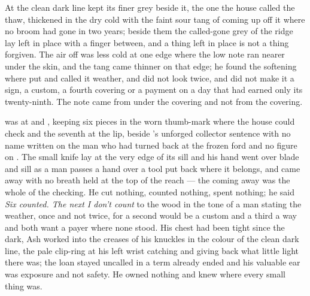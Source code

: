 At  the clean dark line kept its finer grey beside it, the one the house called the thaw, thickened in the dry cold with the faint sour tang of  coming up off it where no broom had gone in two years; beside them the called-gone grey of the ridge lay left in place with a finger between, and a thing left in place is not a thing forgiven. The air off  was less cold at one edge where the low note ran nearer under the skin, and the tang came thinner on that edge; he found the softening where put and called it weather, and did not look twice, and did not make it a sign, a custom, a fourth covering or a payment on a day that had earned only its twenty-ninth. The note came from under the covering and not from the covering.

 was at  and , keeping six pieces in the worn thumb-mark where the house could check and the seventh at the lip, beside 's unforged collector sentence with no name written on the man who had turned back at the frozen ford and no figure on . The small knife lay at the very edge of its sill and his hand went over blade and sill as a man passes a hand over a tool put back where it belongs, and came away with no breath held at the top of the reach --- the coming away was the whole of the checking. He cut nothing, counted nothing, spent nothing; he said \emph{Six counted. The next I don't count} to the wood in the tone of a man stating the weather, once and not twice, for a second would be a custom and a third a way and both want a payer where none stood. His chest had been tight since the dark, Ash worked into the creases of his knuckles in the colour of the clean dark line, the pale clip-ring at his left wrist catching and giving back what little light there was; the loan stayed uncalled in a term already ended and his valuable ear was exposure and not safety. He owned nothing and knew where every small thing was.

